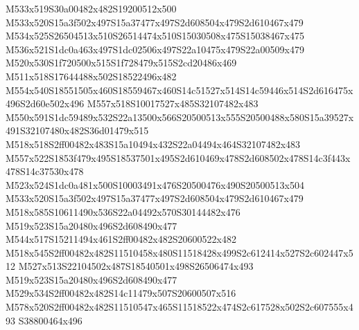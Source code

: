 \documentclass{article}
\begin{document}
\begin{multicols}{2}
M533x519S30a00482x482S19200512x500 M533x520S15a3f502x497S15a37477x497S2d608504x479S2d610467x479 M534x525S26504513x510S26514474x510S15030508x475S15038467x475 M536x521S1dc0a463x497S1dc02506x497S22a10475x479S22a00509x479 M520x530S1f720500x515S1f728479x515S2cd20486x469 M511x518S17644488x502S18522496x482 M554x540S18551505x460S18559467x460S14c51527x514S14c59446x514S2d616475x496S2d60e502x496 M557x518S10017527x485S32107482x483 M550x591S1dc59489x532S22a13500x566S20500513x555S20500488x580S15a39527x491S32107480x482S36d01479x515 M518x518S2ff00482x483S15a10494x432S22a04494x464S32107482x483 M557x522S1853f479x495S18537501x495S2d610469x478S2d608502x478S14c3f443x478S14c37530x478 M523x524S1dc0a481x500S10003491x476S20500476x490S20500513x504 M533x520S15a3f502x497S15a37477x497S2d608504x479S2d610467x479 M518x585S10611490x536S22a04492x570S30144482x476 M519x523S15a20480x496S2d608490x477 M544x517S15211494x461S2ff00482x482S20600522x482 M518x545S2ff00482x482S11510458x480S11518428x499S2c612414x527S2c602447x512 M527x513S22104502x487S18540501x498S26506474x493 M519x523S15a20480x496S2d608490x477 M529x534S2ff00482x482S14c11479x507S20600507x516 M578x520S2ff00482x482S11510547x465S11518522x474S2c617528x502S2c607555x493 S38800464x496











\end{multicols}
\end{document}
